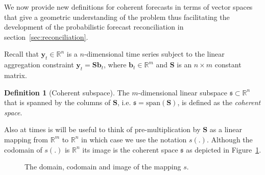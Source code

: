 \documentclass[a4paper, 11pt]{article}
\theoremstyle{theo}
\theoremstyle{definition}
\newtheorem{definition}{Definition}[section]
\begin{document}
We now provide new definitions for coherent forecasts in terms of vector spaces that give a geometric understanding of the problem thus facilitating the development of the probabilistic forecast reconciliation in section~\ref{sec:reconciliation}. 

Recall that $\bm{y}_t \in \mathbb{R}^n$ is a $n$-dimensional time series subject to the linear aggregation constraint $\bm{y}_t = \bm{S}\bm{b}_t$, where $\bm{b}_t \in \mathbb{R}^m$ and $\bm{S}$ is an $n \times m$ constant matrix.

\begin{definition}[Coherent subspace]\label{def:cohspace}
 The $m$-dimensional linear subspace $\mathfrak{s}\subset \mathbb{R}^n$ that is spanned by the columns of $\bm{S}$, i.e. $\mathfrak{s}=\mbox{span}(\bm{S})$, is defined as the {\em coherent space}. 
\end{definition}

Also at times is  will be useful to think of pre-multiplication by $\bm{S}$ as a linear mapping from $\mathbb{R}^m$ to $\mathbb{R}^n$ in which case we use the notation $s(.)$.  Although the codomain of $s(.)$ is $\mathbb{R}^n$ its image is the coherent space $\mathfrak{s}$ as depicted in Figure~\ref{fig2}.

\begin{figure}[H]
  \begin{center}
    \newline
  \end{center}
  \caption{The domain, codomain and image of the mapping $s$.}\label{fig2}
\end{figure}
\end{document}
